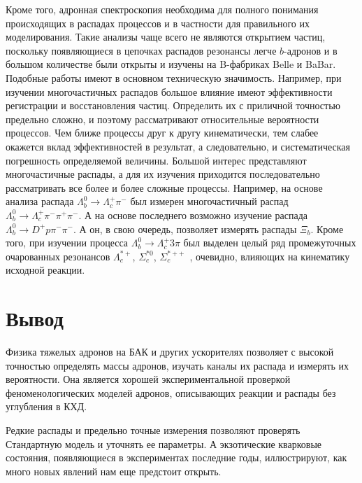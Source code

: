 \documentclass[a4paper, 10pt, twocolumn]{article}
\begin{document}
Кроме того, адронная спектроскопия необходима для полного понимания 
происходящих в распадах процессов и в частности для правильного их 
моделирования. Такие анализы чаще всего не являются открытием частиц, 
поскольку появляющиеся в цепочках распадов резонансы легче $b$-адронов 
и в большом количестве были открыты и изучены на B-фабриках Belle 
и BaBar. Подобные работы имеют в основном техническую значимость. 
Например, при изучении многочастичных распадов большое влияние имеют 
эффективности регистрации и восстановления частиц. Определить их 
с приличной точностью предельно сложно, и поэтому рассматривают 
относительные вероятности процессов. Чем ближе процессы друг к другу 
кинематически, тем слабее окажется вклад эффективностей в результат, 
а следовательно, и систематическая погрешность определяемой величины. 
Большой интерес представляют многочастичные распады, а для их изучения 
приходится последовательно рассматривать все более и более сложные 
процессы. Например, на основе анализа распада $\Lambda_b^0 \to 
\Lambda_c^+ \pi^-$ был измерен многочастичный распад $\Lambda_b^0 \to 
\Lambda_c^+ \pi^-\pi^+\pi^-$. А на основе последнего возможно изучение 
распада $\Lambda_b^0 \to D^+ p \pi^-\pi^-$. А он, в свою очередь, 
позволяет измерять распады $\Xi_b$. Кроме того, при изучении процесса 
$\Lambda_b^0 \to \Lambda_c^+ 3\pi$ был выделен целый ряд промежуточных 
очарованных резонансов $\Lambda_c^{*+}$, $\Sigma_c^{*0}$, 
$\Sigma_c^{*++}$~\cite{LbtoLc3pi}, очевидно, влияющих на кинематику 
исходной реакции.


\section{Вывод}

Физика тяжелых адронов на БАК и других ускорителях позволяет с высокой 
точностью определять массы адронов, изучать каналы их распада 
и измерять их вероятности. Она является хорошей экспериментальной 
проверкой феноменологических моделей адронов, описывающих реакции 
и распады без углубления в КХД.

Редкие распады и предельно точные измерения позволяют проверять 
Стандартную модель и уточнять ее параметры. А экзотические кварковые 
состояния, появляющиеся в экспериментах последние годы, иллюстрируют, 
как много новых явлений нам еще предстоит открыть.




\end{document}
